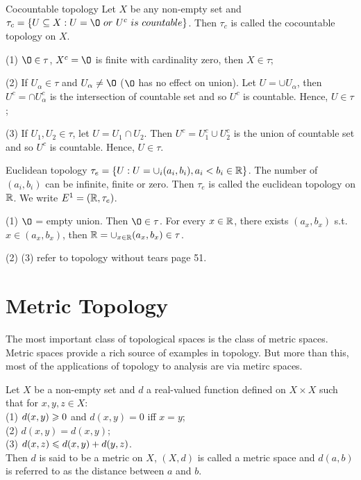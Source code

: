 \begin{example}{Cocountable topology}{}
    Let $X$ be any non-empty set and $\tau_c = \{U\subseteq X: U=\O \ or \ U^{c}\ is \ countable\}$.
        Then $\tau_c$ is called the cocountable topology on $X$.
\end{example}
(1) $\O\in\tau$, $X^c=\O$ is finite with cardinality zero, then $X\in\tau$;
\par
(2) If $U_{\alpha}\in\tau$ and $U_{\alpha}\neq\O$ ($\O$ has no effect on union).
Let $U=\cup U_{\alpha}$, then $U^c=\cap U_{\alpha}^c$ is the intersection of countable set and so $U^c$ is countable.
Hence, $U\in\tau$;
\par
(3) If $U_1,U_2\in\tau$, let $U=U_1\cap U_2$. Then $U^c=U_1^c\cup U_2^c$ is the union of countable set and so $U^c$ is countable.
Hence, $U\in\tau$. 

\begin{example}{Euclidean topology}{}
    $\tau_e = \{U : U=\cup_{i} (a_i,b_i), a_i<b_i\in\mathbb{R}\}$. The number of $(a_i,b_i)$ can be infinite, finite or zero.
        Then $\tau_e$ is called the euclidean topology on $\mathbb{R}$. We write $E^1=(\mathbb{R},\tau_e)$.
\end{example}
(1) $\O$ = empty union. Then $\O\in \tau$. 
For every $x\in \mathbb{R}$, there exists $(a_x,b_x)$ s.t. $x\in(a_x,b_x)$, 
then $\mathbb{R}=\cup_{x\in\mathbb{R}}(a_x,b_x)\in\tau$.
\par
(2) (3) refer to topology without tears page 51.

\section{Metric Topology}

The most important class of topological spaces is the class of metric spaces.
Metric spaces provide a rich source of examples in topology. But more than this, 
most of the applications of topology to analysis are via metirc spaces.

\begin{definition}{}{}
    Let $X$ be a non-empty set and $d$ a real-valued function defined on $X\times X$ such that for $x,y,z\in X$:
    \\
    (1) $d(x,y)\geqslant 0$ and $d(x,y)=0$ iff $x=y$;\\
    (2) $d(x,y)=d(x,y)$;\\
    (3) $d(x,z)\leqslant d(x,y) + d(y,z)$.\\
    Then $d$ is said to be a metric on $X$, $(X,d)$ is called a metric space and $d(a,b)$ is referred to as the distance between $a$ and $b$.
\end{definition}

